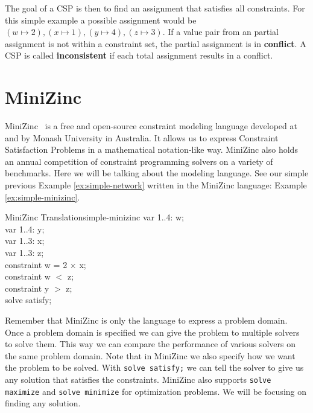 The goal of a CSP is then to find an assignment that satisfies all constraints. For this simple example a possible assignment would be $(w \mapsto 2), (x \mapsto 1), (y \mapsto 4), (z \mapsto 3)$. If a value pair from an partial assignment is not within a constraint set, the partial assignment is in \textbf{conflict}. A CSP is called \textbf{inconsistent} if each total assignment results in a conflict.

\section{MiniZinc}

MiniZinc~\cite{minizinc:2007} is a free and open-source constraint modeling language developed at and by Monash University in Australia. It allows us to express Constraint Satisfaction Problems in a mathematical notation-like way. MiniZinc also holds an annual competition of constraint programming solvers on a variety of benchmarks. Here we will be talking about the modeling language. See our simple previous Example \ref{ex:simple-network} written in the MiniZinc language: Example \ref{ex:simple-minizinc}.

\begin{example}{MiniZinc Translation}{simple-minizinc}
	var 1..4: w; \\
	var 1..4: y; \\
	var 1..3: x; \\
	var 1..3: z; \\

	constraint w = 2 $\times$ x; \\
	constraint w $<$ z; \\
	constraint y $>$ z; \\

	solve satisfy;
\end{example}

Remember that MiniZinc is only the language to express a problem domain. Once a problem domain is specified we can give the problem to multiple solvers to solve them. This way we can compare the performance of various solvers on the same problem domain. Note that in MiniZinc we also specify how we want the problem to be solved. With \verb|solve satisfy;| we can tell the solver to give us any solution that satisfies the constraints. MiniZinc also supports \verb|solve maximize| and \verb|solve minimize| for optimization problems. We will be focusing on finding any solution.

